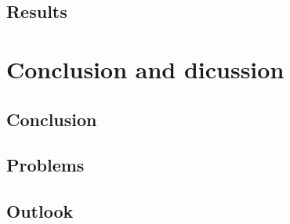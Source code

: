 \hypertarget{results}{%
\section{Results}\label{results}}

\hypertarget{conclusion-and-dicussion}{%
\chapter{Conclusion and dicussion}\label{conclusion-and-dicussion}}

\hypertarget{conclusion}{%
\section{Conclusion}\label{conclusion}}

\hypertarget{problems}{%
\section{Problems}\label{problems}}

\hypertarget{outlook}{%
\section{Outlook}\label{outlook}}

